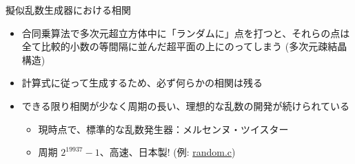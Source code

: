 \begin{frame}[t,fragile]{擬似乱数生成器における相関}
  \begin{itemize}
  \item 合同乗算法で多次元超立方体中に「ランダムに」点を打つと、それらの点は全て比較的小数の等間隔に並んだ超平面の上にのってしまう (多次元疎結晶構造)
  \item 計算式に従って生成するため、必ず何らかの相関は残る
  \item できる限り相関が少なく周期の長い、理想的な乱数の開発が続けられている
    \begin{itemize}
    \item 現時点で、標準的な乱数発生器：メルセンヌ・ツイスター
    \item 周期 $2^{19937}-1$、高速、日本製! (例: \href{https://github.com/todo-group/computer-experiments/blob/master/exercise/monte_carlo/random.c}{random.c})
    \end{itemize}
  \end{itemize}
\end{frame}

